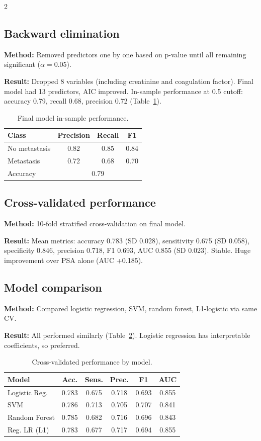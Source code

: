 ﻿\documentclass[a4paper,10pt]{article}
\begin{document}
\begin{multicols*}{2}
\subsection{Backward elimination}
\textbf{Method:} Removed predictors one by one based on p-value until all remaining significant ($\alpha=0.05$).

\textbf{Result:} Dropped 8 variables (including creatinine and coagulation factor). Final model had 13 predictors, AIC improved. In-sample performance at 0.5 cutoff: accuracy 0.79, recall 0.68, precision 0.72 (Table~\ref{tab:final_perf}).

\begin{table}[H]
\centering
\caption{Final model in-sample performance.}
\label{tab:final_perf}
\begin{tabular}{lccc}
\toprule
Class & Precision & Recall & F1 \\
\midrule
No metastasis & 0.82 & 0.85 & 0.84 \\
Metastasis & 0.72 & 0.68 & 0.70 \\
\midrule
Accuracy & \multicolumn{3}{c}{0.79} \\
\bottomrule
\end{tabular}
\end{table}

\subsection{Cross-validated performance}
\textbf{Method:} 10-fold stratified cross-validation on final model.

\textbf{Result:} Mean metrics: accuracy 0.783 (SD 0.028), sensitivity 0.675 (SD 0.058), specificity 0.846, precision 0.718, F1 0.693, AUC 0.855 (SD 0.023). Stable. Huge improvement over PSA alone (AUC +0.185).

\subsection{Model comparison}
\textbf{Method:} Compared logistic regression, SVM, random forest, L1-logistic via same CV.

\textbf{Result:} All performed similarly (Table~\ref{tab:modelcomp}). Logistic regression has interpretable coefficients, so preferred.

\begin{table}[H]
\centering
\caption{Cross-validated performance by model.}
\label{tab:modelcomp}
\begin{tabular}{lccccc}
\toprule
Model & Acc. & Sens. & Prec. & F1 & AUC \\
\midrule
Logistic Reg. & 0.783 & 0.675 & 0.718 & 0.693 & 0.855 \\
SVM & 0.786 & 0.713 & 0.705 & 0.707 & 0.841 \\
Random Forest & 0.785 & 0.682 & 0.716 & 0.696 & 0.843 \\
Reg. LR (L1) & 0.783 & 0.677 & 0.717 & 0.694 & 0.855 \\
\bottomrule
\end{tabular}
\end{table}


\end{multicols*}
\end{document}
